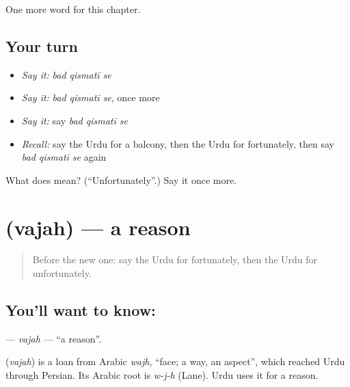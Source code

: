 \begin{grammarlens}[title={What you've built}]
One more word for this chapter.
\end{grammarlens}

\subsection*{Your turn}
\begin{itemize}
\raggedright
  \item \emph{Say it:} \emph{bad qismatī se}
  \item \emph{Say it:} \emph{bad qismatī se}, once more
  \item \emph{Say it:} say \emph{bad qismatī se}
  \item \emph{Recall:} say the Urdu for a balcony, then the Urdu for fortunately, then say \emph{bad qismatī se} again
\end{itemize}

\begin{tcolorbox}[breakable,colback=teal!4,colframe=teal!35!black,title={Before you move on}]
What does    mean? (\textquotedblleft{}Unfortunately\textquotedblright{}.) Say it once more.
\end{tcolorbox}
\section[\texorpdfstring{\ur{وجہ} (vajah)}{وجہ (vajah)}]{ (vajah) — a reason}

\label{lesson:UR-C220-vajah}



\begin{quote}
Before the new one: say the Urdu for fortunately, then the Urdu for unfortunately.
\end{quote}

\subsection*{You'll want to know: }
\textbf{} — \emph{vajah} — \textquotedblleft{}a reason\textquotedblright{}.

\begin{cousinweb}
\textbf{} (\emph{vajah}) is a loan from Arabic \emph{wajh}, \textquotedblleft{}face; a way, an aspect\textquotedblright{}, which reached Urdu through Persian. Its Arabic root is \emph{w-j-h} (Lane). Urdu uses it for a reason.
\end{cousinweb}


